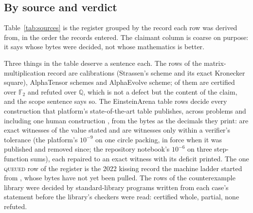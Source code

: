 \documentclass[11pt]{article}
\theoremstyle{plain}
\theoremstyle{definition}
\begin{document}
\subsection{By source and verdict}

Table~\ref{tab:sources} is the register grouped by the record each row was derived from, in the order the records entered. The claimant column is coarse on purpose: it says whose bytes were decided, not whose mathematics is better.

\begin{table}[htbp]\centering\footnotesize
\setlength{\tabcolsep}{3.5pt}
\caption{The register by source. \RegRows{} rows from \RegSources{} records on \RegPages{} pages; a row counts once, an aggregate row is one audit. The entered column is the first commit whose record held the source's first row.}\label{tab:sources}
\end{table}

Three things in the table deserve a sentence each. The \MmRows{} rows of the matrix-multiplication record are \MmCalibration{} calibrations (Strassen's scheme \cite{Strassen69} and its exact Kronecker square), \MmAlphaTensor{} AlphaTensor schemes and \MmAlphaEvolve{} AlphaEvolve scheme; \MmCharTwo{} of them are certified over $\mathbb{F}_2$ and refuted over $\mathbb{Q}$, which is not a defect but the content of the claim, and the scope sentence says so. The \EaRows{} EinsteinArena table rows decide every construction that platform's state-of-the-art table publishes, across \EaProblems{} problems and including one human construction \cite{Haugland16}, from the bytes as the decimals they print: \EaWitnessed{} are exact witnesses of the value stated and \EaRepaired{} are witnesses only within a verifier's tolerance (the platform's $10^{-9}$ on one circle packing, in force when it was published and removed since; the repository notebook's $10^{-6}$ on three step-function sums), each repaired to an exact witness with its deficit printed. The one \textsc{queued} row of the register is the 2022 kissing record the machine ladder started from \cite{Ganzhinov22}, whose bytes have not yet been pulled. The \CxRows{} rows of the counterexample library \cite{Sra26} were decided by standard-library programs written from each case's statement before the library's checkers were read: \CxCertified{} certified whole, \CxPartial{} partial, none refuted.
\end{document}
